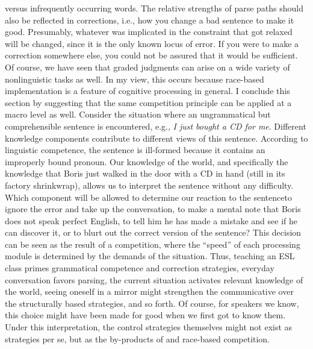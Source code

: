  versus infrequently occurring words. The relative strengths of parse paths should also be reflected in corrections, i.e., how you change a bad sentence to make it good. Presumably, whatever was implicated in the constraint that got relaxed will be changed, since it is the only known locus of error. If you were to make a correction somewhere else, you could not be assured that it would be sufficient. Of course, we have seen that graded judgments can arise on a wide variety of nonlinguistic tasks as well. In my view, this occurs because race-based implementation is a feature of cognitive processing in general. I conclude this section by suggesting that the same competition principle can be applied at a macro level as well. Consider the situation where an ungrammatical but comprehensible sentence is encountered, e.g., \textit{I just bought a CD for me}. Different knowledge components contribute to different views of this sentence. According to linguistic competence, the sentence is ill-formed  because it contains an improperly bound pronoun. Our knowledge of the world, and specifically the knowledge that Boris just walked in the door with a CD in hand (still in its factory shrinkwrap), allows us to interpret the sentence without any difficulty. Which component will be allowed to determine our reaction to the sentence\schdash{}to ignore the error and take up the conversation, to make a mental note that Boris does not speak perfect English, to tell him he has made a mistake and see if he can discover it, or to blurt out the correct version of the sentence? This decision can be seen as the result of a competition, where the ``speed'' of each processing module is determined by the demands of the situation. Thus, teaching an ESL class primes grammatical competence and correction strategies, everyday conversation favors parsing, the current situation activates relevant knowledge of the world, seeing oneself in a mirror might strengthen the communicative over the structurally based strategies, and so forth. Of course, for speakers we know, this choice might have been made for good when we first got to know them. Under this interpretation, the control strategies themselves might not exist as strategies per se, but as the by-products of  and race-based competition.

